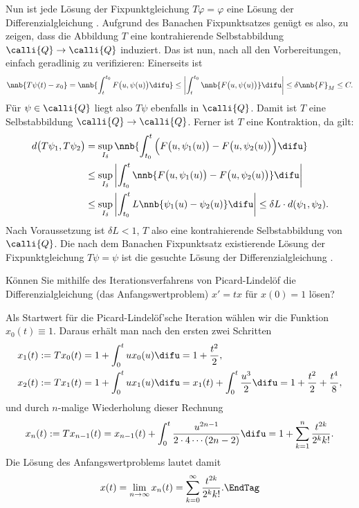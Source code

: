 \begin{antwort}
  Nun ist jede Lösung der Fixpunktgleichung $T\varphi = \varphi$ eine 
  Lösung der Differenzialgleichung {\astref}. Aufgrund des 
  Banach\sch en Fixpunktsatzes 
  genügt es also, zu zeigen, dass die Abbildung $T$ eine 
  kontrahierende Selbstabbildung 
  $\calli{Q}\to\calli{Q}$ induziert. Das ist nun, nach all den 
  Vorbereitungen, einfach geradlinig zu verifizieren:  
  Einerseits ist
  \[
  \nnb{ T\psi (t) - x_0 } = 
  \nnb{ \int_t^{t_0} F \big( u, \psi(u) \big) \difu } \le 
  \left| \int_t^{t_0} \nnb{F \big(u,\psi(u) \big)}\difu \right|
  \le  \delta \nnb{F}_M \le C.
  \]
  Für $\psi\in\calli{Q}$ liegt also $T\psi$ ebenfalls in $\calli{Q}$. 
  Damit ist $T$ eine Selbstabbildung $\calli{Q}\to\calli{Q}$. 
  Ferner ist $T$ eine Kontraktion, da gilt:
  \begin{align*}
    d\big( T\psi_1, T\psi_2 \big) &= 
    \sup_{I_\delta} \nnb{ 
      \int_{t_0}^t \Big( F\big( u, \psi_1(u) \big) -  
      F\big( u, \psi_2(u) \big) \Big) \difu } \\
    &\le 
    \sup_{I_\delta} \left| 
      \int_{t_0}^t \nnb{ F\big( u, \psi_1(u) \big) -  
        F\big( u, \psi_2(u) \big) } \difu 
    \right| \\
    &\le 
    \sup_{I_\delta} \left| 
      \int_{t_0}^t L \nnb{ \psi_1(u)  - \psi_2(u) } \difu 
    \right| \le \delta L \cdot d(\psi_1,\psi_2). 
  \end{align*} 
  Nach Voraussetzung ist $\delta L <1$, $T$ also eine kontrahierende 
  Selbstabbildung von $\calli{Q}$. Die nach dem Banach\sch en 
  Fixpunktsatz existierende Lösung der Fixpunktgleichung 
  $T\psi = \psi$ ist die gesuchte Lösung der Differenzialgleichung 
  {\astref}. \AntEnd
\end{antwort} 

\begin{frage}
  Können Sie mithilfe des Iterationsverfahrens 
  von Picard-Lindelöf die Differenzialgleichung 
  (das Anfangswertproblem) $x'=tx$ f\"ur $x(0)=1$ 
  lösen?
\end{frage}

\begin{antwort}
  Als Startwert für die Picard-Lindelöf'sche Iteration 
  wählen wir die Funktion $x_0(t)\equiv 1$. Daraus erhält man 
  nach den ersten zwei Schritten
  \begin{align*}
    x_1(t) := Tx_0(t) &= 1 + \int_0^t u x_0(u) \difu =1+\frac{t^2}{2},\\
    x_2(t) := Tx_1(t) &= 1 + \int_0^t u x_1(u) \difu 
    =x_1(t)+ \int_0^t \frac{u^3}{2} \difu = 
    1+\frac{t^2}{2}+\frac{t^4}{8},  
  \end{align*}
  und durch $n$-malige Wiederholung dieser Rechnung 
  \[
  x_n(t) := Tx_{n-1}(t) = x_{n-1}(t)+\int_0^t 
  \frac{u^{2n-1}}{2\cdot 4\cdots (2n-2)} \difu = 
  1+\sum_{k=1}^n \frac{t^{2k}}{2^k k!}.    
  \]
  Die Lösung des Anfangswertproblems lautet damit
  \[
  x(t) = \lim_{n\to\infty} x_n(t) = \sum_{k=0}^\infty  
  \frac{t^{2k}}{2^k k!}.\EndTag
  \]
\end{antwort}  




